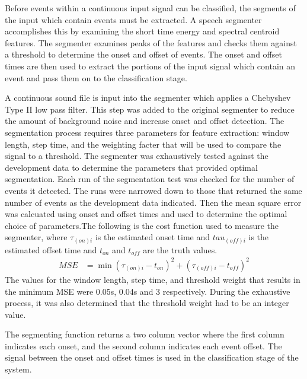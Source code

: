 Before events within a continuous input signal can be classified, the segments of the input which contain events must be extracted. A speech segmenter \cite{silenceRemove} accomplishes this by examining the short time energy and spectral centroid features.  The segmenter examines peaks of the features and checks them against a threshold to determine the onset and offset of events. The onset and offset times are then used to extract the portions of the input signal which contain an event and pass them on to the classification stage. 

A continuous sound file is input into the segmenter which  applies a Chebyshev Type II low pass filter. This step was added to the original segmenter to reduce the amount of background noise and increase onset and offset detection. The segmentation process requires three parameters for feature extraction: window length, step time, and the weighting facter that will be used to compare the signal to a threshold. The segmenter was exhaustively tested against the development data to determine the parameters that provided optimal segmentation. Each run of the segmentation test was checked for the number of events it detected. The runs were narrowed down to those that returned the same number of events as the development data indicated. Then the mean square error was calcuated using onset and offset times and used to determine the optimal choice of parameters.The following is the cost function used to measure the segmenter, where $\tau_{(on)i}$ is the estimated onset time and $tau_{(off)i}$ is the estimated offset time and $t_{on}$ and $t_{off}$ are the truth values.
\begin{align}
{MSE} &=\min{ (\tau_{(on)i}-t_{on} )^2 + (\tau_{(off)i}-t_{off})^2  }
\end{align}
The values for the window length, step time, and threshold weight that results in the minimum MSE were 0.05s, 0.04s and 3 respectively. During the exhaustive process, it was also determined that the threshold weight had to be an integer value. 

The segmenting function returns a two column vector where the first column indicates each onset, and the second column indicates each event offset. The signal between the onset and offset times is used in the classification stage of the system. 